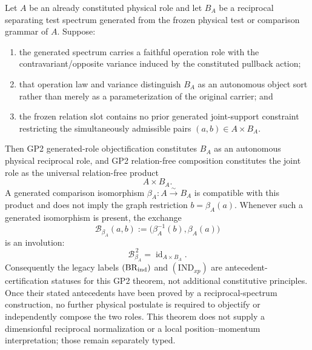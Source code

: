 \documentclass[12pt,a4paper]{article}
\begin{document}
\begin{theorem}
\label{p2:thm:gp2-generated-reciprocal-role-closure}
Let \(A\) be an already constituted physical role and let \(B_A\) be a
reciprocal separating test spectrum generated from the frozen physical test
or comparison grammar of \(A\).  Suppose:
\begin{enumerate}[label=(\roman*),leftmargin=2em]
\item the generated spectrum carries a faithful operation role with the
contravariant/opposite variance induced by the constituted pullback action;
\item that operation law and variance distinguish \(B_A\) as an autonomous
object sort rather than merely as a parameterization of the original carrier;
and
\item the frozen relation slot contains no prior generated joint-support
constraint restricting the simultaneously admissible pairs \((a,b)\in
A\times B_A\).
\end{enumerate}
Then GP2 generated-role objectification constitutes \(B_A\) as an autonomous
physical reciprocal role, and GP2 relation-free composition constitutes the
joint role as the universal relation-free product
\[
             A\times B_A.
\]
A generated comparison isomorphism
\(\beta_A:A\stackrel{\sim}{\longrightarrow}B_A\) is compatible with this
product and does not imply the graph restriction \(b=\beta_A(a)\).  Whenever
such a generated isomorphism is present, the exchange
\[
 \mathcal B_{\beta_A}(a,b)
 :=\bigl(\beta_A^{-1}(b),\beta_A(a)\bigr)
\]
is an involution:
\[
             \mathcal B_{\beta_A}^{\,2}=\operatorname{id}_{A\times B_A}.
\]
Consequently the legacy labels \((\mathrm{BR}_{\rm ind})\) and
\((\mathrm{IND}_{xp})\) are antecedent-certification statuses for this GP2
theorem, not additional constitutive principles.  Once their stated
antecedents have been proved by a reciprocal-spectrum construction, no further
physical postulate is required to objectify or independently compose the two
roles.  This theorem does not supply a dimensionful reciprocal normalization
or a local position--momentum interpretation; those remain separately typed.
\end{theorem}
\end{document}
